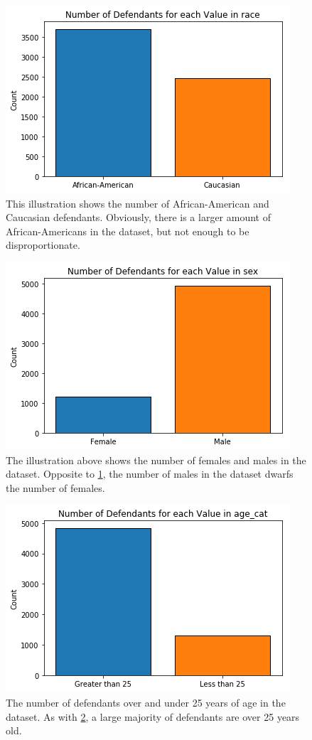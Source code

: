 \documentclass[11pt, fleqn, titlepage]{article}
\begin{document}
	\begin{figure}[H]
		\centering
		\includegraphics[width=0.5\linewidth]{imgs/categorical_race}
		\caption{This illustration shows the number of African-American and Caucasian defendants. Obviously, there is a larger amount of African-Americans in the dataset, but not enough to be disproportionate.}
		\label{fig:categoricalrace}
	\end{figure}
	
	\begin{figure}[H]
		\centering
		\includegraphics[width=0.5\linewidth]{imgs/categorical_sex}
		\caption{The illustration above shows the number of females and males in the dataset. Opposite to \ref{fig:categoricalrace}, the number of males in the dataset dwarfs the number of females.}
		\label{fig:categoricalsex}
	\end{figure}
	
	\begin{figure}[H]
		\centering
		\includegraphics[width=0.5\linewidth]{imgs/categorical_age_cat}
		\caption{The number of defendants over and under 25 years of age in the dataset. As with \ref{fig:categoricalsex}, a large majority of defendants are over 25 years old.}
		\label{fig:categoricalagecat}
	\end{figure}
	
\end{document}
